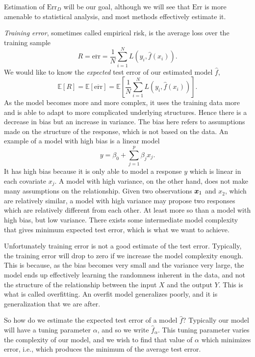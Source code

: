 Estimation of $\text{Err}_D$ will be our goal, although we will see that $\text{Err}$ is more amenable to statistical analysis, and most methods effectively estimate it.

\textit{Training error}, sometimes called empirical risk, is the average loss over the training sample
\begin{equation}
    R=\overline{\text{err}}=\frac{1}{N}\sum_{i=1}^NL(y_i,\hat{f}(x_i)).
\end{equation}
We would like to know the \textit{expected} test error of our estimated model $\hat{f}$,
\begin{equation}
    \mathbb{E}[R]=\mathbb{E}[\overline{\text{err}}]=\mathbb{E}\left[\frac{1}{N}\sum_{i=1}^NL(y_i,\hat{f}(x_i))\right].
\end{equation}
As the model becomes more and more complex, it uses the training data more and is able to adapt to more complicated underlying structures.
Hence there is a decrease in bias but an increase in variance.
The bias here refers to assumptions made on the structure of the response, which is not based on the data.
An example of a model with high bias is a linear model
\begin{equation}
    y=\beta_0+\sum_{j=1}^p\beta_jx_j.
\end{equation}
It has high bias because it is only able to model a response $y$ which is linear in each covariate $x_j$.
A model with high variance, on the other hand, does not make many assumptions on the relationship.
Given two observations $\bm{x}_1$ and $x_2$, which are relatively similar, a model with high variance may propose two responses which are relatively different from each other.
At least more so than a model with high bias, but low variance.
There exists some intermediate model complexity that gives minimum expected test error, which is what we want to achieve.

Unfortunately training error is not a good estimate of the test error.
Typically, the training error will drop to zero if we increase the model complexity enough.
This is because, as the bias becomes very small and the variance very large, the model ends up effectively learning the randomness inherent in the data, and not the structure of the relationship between the input $X$ and the output $Y$.
This is what is called overfitting.
An overfit model generalizes poorly, and it is generalization that we are after.

So how do we estimate the expected test error of a model $\hat{f}$?
Typically our model will have a tuning parameter $\alpha$, and so we write $\hat{f}_\alpha$.
This tuning parameter varies the complexity of our model, and we wish to find that value of $\alpha$ which minimizes error, i.e., which produces the minimum of the average test error.

